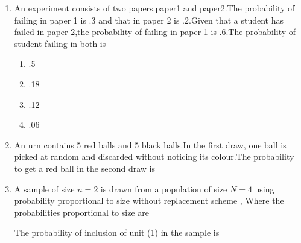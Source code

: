 \begin{enumerate}[label=\thesection.\arabic*.,ref=\thesection.\theenumi]
\item An experiment consists of two papers.paper1 and paper2.The probability of failing in paper 1 is .3 and that in paper 2 is .2.Given that a student has failed in paper 2,the probability of failing in paper 1 is .6.The probability of student failing in both is\\
\begin{enumerate}
    \setlength\itemsep{2em}
\item .5 
\item .18 
\item .12 
\item .06 
\end{enumerate}
%
\solution

%
\item An urn contains 5 red balls and 5 black balls.In the first draw, one ball is picked at random and discarded without noticing its colour.The probability to get a red ball in the second draw is 
\begin{enumerate}
    \end{enumerate}    
%
\solution

%
%
\item A sample of size $n =2$ is drawn from a population of size $N=4$ using probability proportional to size without replacement scheme , Where the probabilities proportional to size are
\begin{table}[h!]
   \caption*{Table : Probability vs Size}
\end{table}  
The probability of inclusion of unit (1) in the sample is 
\begin{enumerate}
%


\end{enumerate}
\end{enumerate}
